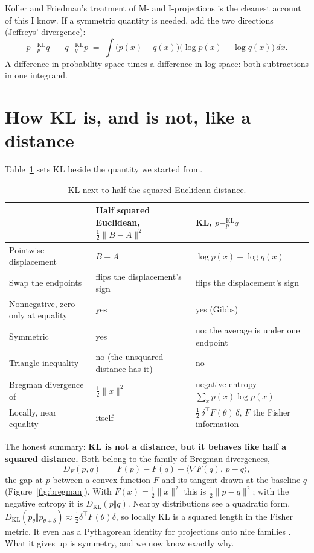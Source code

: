 \documentclass[11pt,oneside]{book}
\newcommand{\kl}[1]{\mathbin{-^{\mathrm{KL}}_{#1}}}       %
\newcommand{\DKL}{D_{\mathrm{KL}}}
\theoremstyle{definition}
\theoremstyle{plain}
\theoremstyle{remark}
\begin{document}
Koller and Friedman's treatment of M- and I-projections \cite[Sec.~8.5]{koller2009} is the cleanest account of
this I know. If a symmetric quantity is needed, add the two directions (Jeffreys' divergence):
\begin{equation}\label{eq:jeffreys}
p\kl{p}q\;+\;q\kl{q}p\;=\;\int\big(p(x)-q(x)\big)\big(\log p(x)-\log q(x)\big)\,dx .
\end{equation}
A difference in probability space times a difference in log space: both subtractions in one integrand.

\section{How KL is, and is not, like a distance}

Table~\ref{tab:distance} sets KL beside the quantity we started from.

\begin{table}[h]
\centering\small
\renewcommand{\arraystretch}{1.25}
\begin{tabularx}{\textwidth}{@{}>{\raggedright\arraybackslash}p{3.6cm}>{\raggedright\arraybackslash}X>{\raggedright\arraybackslash}X@{}}
\toprule
 & Half squared Euclidean, $\tfrac12\lVert B-A\rVert^2$ & KL, $p\kl{p}q$\\
\midrule
Pointwise displacement & $B-A$ & $\log p(x)-\log q(x)$\\
Swap the endpoints & flips the displacement's sign & flips the displacement's sign\\
Nonnegative, zero only at equality & yes & yes (Gibbs)\\
Symmetric & yes & no: the average is under one endpoint\\
Triangle inequality & no (the unsquared distance has it) & no\\
Bregman divergence of & $\tfrac12\lVert x\rVert^2$ & negative entropy $\sum_x p(x)\log p(x)$\\
Locally, near equality & itself & $\tfrac12\,\delta^{\top}F(\theta)\,\delta$, $F$ the Fisher information\\
\bottomrule
\end{tabularx}
\caption{KL next to half the squared Euclidean distance.}
\label{tab:distance}
\end{table}

The honest summary: \textbf{KL is not a distance, but it behaves like half a squared distance.} Both belong to the
family of Bregman divergences,
\[
D_F(p,q)\;=\;F(p)-F(q)-\langle\nabla F(q),\,p-q\rangle,
\]
the gap at $p$ between a convex function $F$ and its tangent drawn at the baseline $q$ (Figure~\ref{fig:bregman}).
With $F(x)=\tfrac12\lVert x\rVert^2$ this is $\tfrac12\lVert p-q\rVert^2$; with the negative entropy it is
$\DKL(p\Vert q)$. Nearby distributions see a quadratic form,
$\DKL(p_\theta\Vert p_{\theta+\delta})\approx\tfrac12\delta^{\top}F(\theta)\delta$, so locally KL is a squared length in the
Fisher metric. It even has a Pythagorean identity for projections onto nice families \cite{csiszar1975}. What it gives up is
symmetry, and we now know exactly why.
\end{document}
